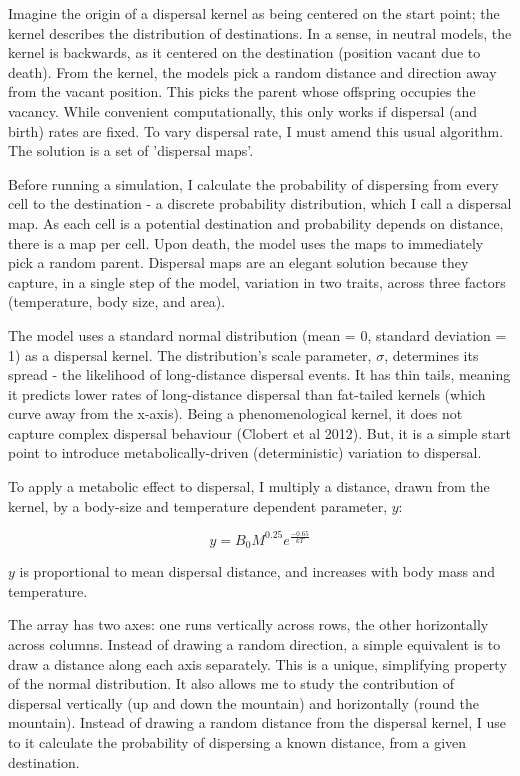 \documentclass[11pt]{article}
\begin{document}
Imagine the origin of a dispersal kernel as being centered on the start point; the kernel describes the distribution of destinations. In a sense, in neutral models, the kernel is backwards, as it centered on the destination (position vacant due to death). From the kernel, the models pick a random distance and direction away from the vacant position. This picks the parent whose offspring occupies the vacancy. While convenient computationally, this only works if dispersal (and birth) rates are fixed. To vary dispersal rate, I must amend this usual algorithm. The solution is a set of 'dispersal maps'.

Before running a simulation, I calculate the probability of dispersing from every cell to the destination - a discrete probability distribution, which I call a dispersal map. As each cell is a potential destination and probability depends on distance, there is a map per cell.
Upon death, the model uses the maps to immediately pick a random parent. Dispersal maps are an elegant solution because they capture, in a single step of the model, variation in two traits, across three factors (temperature, body size, and area).

The model uses a standard normal distribution (mean = 0, standard deviation = 1) as a dispersal kernel. The distribution's scale parameter, $\sigma$, determines its spread - the likelihood of long-distance dispersal events. It has thin tails, meaning it predicts lower rates of long-distance dispersal than fat-tailed kernels (which curve away from the x-axis). Being a phenomenological kernel, it does not capture complex dispersal behaviour (Clobert et al 2012). But, it is a simple start point to introduce metabolically-driven (deterministic) variation to dispersal.

To apply a metabolic effect to dispersal, I multiply a distance, drawn from the kernel, by a body-size and temperature dependent parameter, $y$:

$$y = B_0 M^{0.25} e^{\frac{-0.65}{kT}}$$

$y$ is proportional to mean dispersal distance, and increases with body mass and temperature.

The array has two axes: one runs vertically across rows, the other horizontally across columns. Instead of drawing a random direction, a simple equivalent is to draw a distance along each axis separately. This is a unique, simplifying property of the normal distribution. It also allows me to study the contribution of dispersal vertically (up and down the mountain) and horizontally (round the mountain). Instead of drawing a random distance from the dispersal kernel, I use to it calculate the probability of dispersing a known distance, from a given destination.
\end{document}

